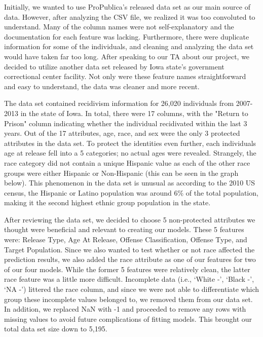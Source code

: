 \documentclass[11pt, sigconf]{acmart}
\begin{document}
\hspace{5mm}Initially, we wanted to use ProPublica's released data set as our main source of data. However, after analyzing the CSV file, we realized it was too convoluted to understand. Many of the column names were not self-explanatory and the documentation for each feature was lacking. Furthermore, there were duplicate information for some of the individuals, and cleaning and analyzing the data set would have taken far too long. After speaking to our TA about our project, we decided to utilize another data set released by Iowa state's government correctional center facility. Not only were these feature names straightforward and easy to understand, the data was cleaner and more recent. 

The data set contained recidivism information for 26,020 individuals from 2007-2013 in the state of Iowa. In total, there were 17 columns, with the "Return to Prison" column indicating whether the individual recidivated within the last 3 years. Out of the 17 attributes, age, race, and sex were the only 3 protected attributes in the data set. To protect the identities even further, each individuals age at release fell into a 5 categories; no actual ages were revealed. Strangely, the race category did not contain a unique Hispanic value as each of the other race groups were either Hispanic or Non-Hispanic (this can be seen in the graph below). This phenomenon in the data set is unusual as according to the 2010 US census, the Hispanic or Latino population was around 6\% of the total population, making it the second highest ethnic group population in the state.\cite{2}

After reviewing the data set, we decided to choose 5 non-protected attributes we thought were beneficial and relevant to creating our models. These 5 features were: Release Type, Age At Release, Offense Classification, Offense Type, and Target Population. Since we also wanted to test whether or not race affected the prediction results, we also added the race attribute as one of our features for two of our four models. While the former 5 features were relatively clean, the latter race feature was a little more difficult. Incomplete data (i.e., ‘White -’, ‘Black -’, ‘NA -’) littered the race column, and since we were not able to differentiate which group these incomplete values belonged to, we removed them from our data set. In addition, we replaced NaN with -1 and proceeded to remove any rows with missing values to avoid future complications of fitting models. This brought our total data set size down to 5,195.
\end{document}
